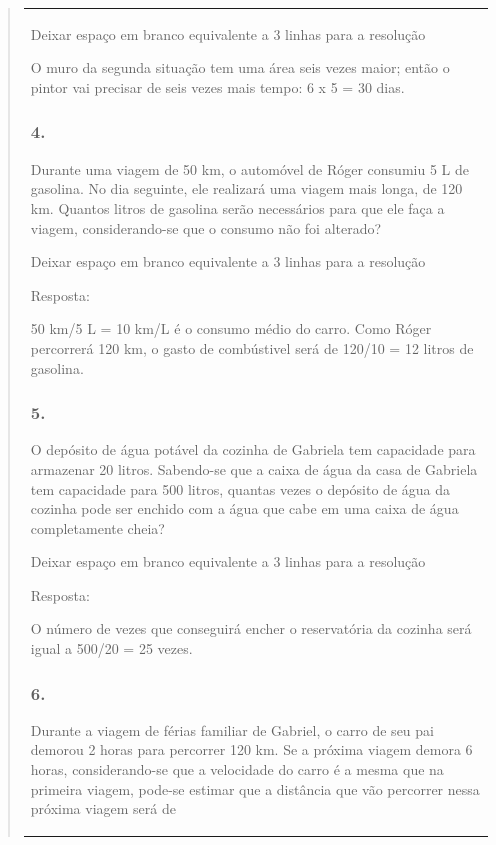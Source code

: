 \begin{enumerate}
\begin{escolha}
\begin{enumerate}
\begin{itemize}
\begin{itemize}
\begin{escolha}
\begin{quote}
\begin{escolha}
{\begin{longtable}[]{@{}l@{}}
\begin{itemize}
Deixar espaço em branco equivalente a 3 linhas para a resolução

O muro da segunda situação tem uma área seis vezes maior; então o pintor vai precisar de seis vezes mais tempo: 6 x 5 = 30 dias.

\subsubsection{4.}\label{section-120}

Durante uma viagem de 50 km, o automóvel de Róger consumiu 5 L de
gasolina. No dia seguinte, ele realizará uma viagem mais longa, de 120 km.
Quantos litros de gasolina serão necessários para que ele faça a viagem,
considerando-se que o consumo não foi alterado?

Deixar espaço em branco equivalente a 3 linhas para a resolução

Resposta:

50 km/5 L = 10 km/L é o consumo médio do carro.
Como Róger percorrerá 120 km, o gasto de combústivel será de 120/10 = 12
litros de gasolina.

\subsubsection{5.}\label{section-121}

O depósito de água potável da cozinha de Gabriela tem capacidade para
armazenar 20 litros. Sabendo-se que a caixa de água da casa de Gabriela
tem capacidade para 500 litros, quantas vezes o depósito de água da
cozinha pode ser enchido com a água que cabe em uma caixa de água
completamente cheia?

Deixar espaço em branco equivalente a 3 linhas para a resolução

Resposta:

O número de vezes que conseguirá encher o reservatória da cozinha será
igual a 500/20 = 25 vezes.

\subsubsection{6.}\label{section-122}

Durante a viagem de férias familiar de Gabriel, o carro de seu pai
demorou 2 horas para percorrer 120 km. Se a próxima viagem demora 6
horas, considerando-se que a velocidade do carro é a mesma que na primeira
viagem, pode-se estimar que a distância que vão percorrer nessa próxima
viagem será de


\end{itemize}
\end{longtable}}
\end{escolha}
\end{quote}
\end{escolha}
\end{itemize}
\end{itemize}
\end{enumerate}
\end{escolha}
\end{enumerate}
